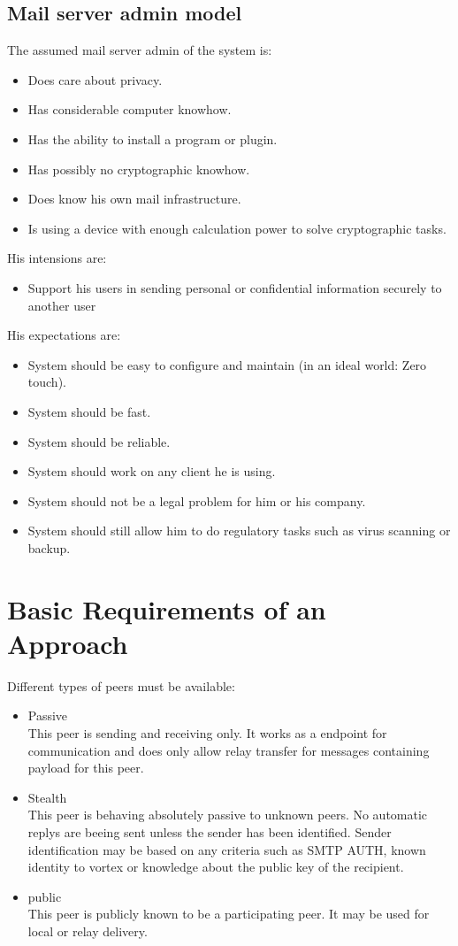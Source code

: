 \subsection{Mail server admin model}
The assumed mail server admin of the system is:
\begin{itemize}
\item Does care about privacy.
\item Has considerable computer knowhow.
\item Has the ability to install a program or plugin.
\item Has possibly no cryptographic knowhow.
\item Does know his own mail infrastructure.
\item Is using a device with enough calculation power to solve cryptographic tasks.
\end{itemize}
His intensions are:
\begin{itemize}
\item Support his users in sending personal or confidential information securely to another user
\end{itemize}
His expectations are:
\begin{itemize}
\item System should be easy to configure and maintain (in an ideal world: Zero touch). 
\item System should be fast.
\item System should be reliable.
\item System should work on any client he is using.
\item System should not be a legal problem for him or his company.
\item System should still allow him to do regulatory tasks such as virus scanning or backup.
\end{itemize}

\section{Basic Requirements of an Approach}
Different types of peers must be available:

\begin{itemize}
  \item Passive\\
	This peer is sending and receiving only. It works as a endpoint for communication and does only allow relay transfer for messages containing payload for this peer.
	\item Stealth\\
	This peer is behaving absolutely passive to unknown peers. No automatic replys are beeing sent unless the sender has been identified. Sender identification may be based on any criteria such as SMTP AUTH, known identity to vortex or knowledge about the public key of the recipient.
	\item public\\
	This peer is publicly known to be a participating peer. It may be used for local or relay delivery.
\end{itemize}

